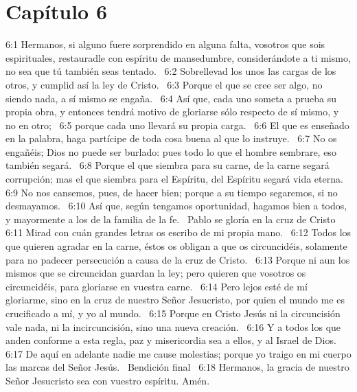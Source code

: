 \section*{Capítulo 6 }

6:1 Hermanos, si alguno fuere sorprendido en alguna falta, vosotros que sois espirituales, restauradle con espíritu de mansedumbre, considerándote a ti mismo, no sea que tú también seas tentado.  
6:2 Sobrellevad los unos las cargas de los otros, y cumplid así la ley de Cristo.  
6:3 Porque el que se cree ser algo, no siendo nada, a sí mismo se engaña.  
6:4 Así que, cada uno someta a prueba su propia obra, y entonces tendrá motivo de gloriarse sólo respecto de sí mismo, y no en otro;  
6:5 porque cada uno llevará su propia carga.  
6:6 El que es enseñado en la palabra, haga partícipe de toda cosa buena al que lo instruye.  
6:7 No os engañéis; Dios no puede ser burlado: pues todo lo que el hombre sembrare, eso también segará.  
6:8 Porque el que siembra para su carne, de la carne segará corrupción; mas el que siembra para el Espíritu, del Espíritu segará vida eterna.  
6:9 No nos cansemos, pues, de hacer bien; porque a su tiempo segaremos, si no desmayamos.  
6:10 Así que, según tengamos oportunidad, hagamos bien a todos, y mayormente a los de la familia de la fe.  
Pablo se gloría en la cruz de Cristo  
6:11 Mirad con cuán grandes letras os escribo de mi propia mano.  
6:12 Todos los que quieren agradar en la carne, éstos os obligan a que os circuncidéis, solamente para no padecer persecución a causa de la cruz de Cristo.  
6:13 Porque ni aun los mismos que se circuncidan guardan la ley; pero quieren que vosotros os circuncidéis, para gloriarse en vuestra carne.  
6:14 Pero lejos esté de mí gloriarme, sino en la cruz de nuestro Señor Jesucristo, por quien el mundo me es crucificado a mí, y yo al mundo.  
6:15 Porque en Cristo Jesús ni la circuncisión vale nada, ni la incircuncisión, sino una nueva creación.  
6:16 Y a todos los que anden conforme a esta regla, paz y misericordia sea a ellos, y al Israel de Dios.  
6:17 De aquí en adelante nadie me cause molestias; porque yo traigo en mi cuerpo las marcas del Señor Jesús.  
Bendición final  
6:18 Hermanos, la gracia de nuestro Señor Jesucristo sea con vuestro espíritu. Amén.
